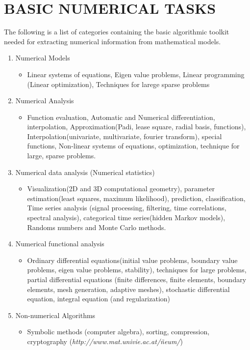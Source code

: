 \documentclass[12pt]{report}
\begin{document}
	\section{BASIC NUMERICAL TASKS}
	The following is a list of categories containing the basic algorithmic toolkit needed for extracting numerical information from mathematical models.
	\begin{enumerate}
		\item Numerical Models
		\begin{itemize}
			\item Linear systems of equations, Eigen value problems, Linear programming (Linear optimization), Techniques for larege sparse problems
		\end{itemize}
	
		\item Numerical Analysis
		\begin{itemize}
			\item Function evaluation, Automatic and Numerical differentiation, interpolation, Approximation(Padi, lease square, radial basis, functions), Interpolation(univariate, multivariate, fourier transform), special functions, Non-linear systems of equations, optimization, technique for large, sparse problems.
		\end{itemize}
		
		\item Numerical data analysis (Numerical statistics)
		\begin{itemize}
			\item Visualization(2D and 3D computational geometry), parameter estimation(least squares, maximum likelihood), prediction, classification, Time series analysis (signal processing, filtering, time correlations, spectral analysis), categorical time series(hidden Markov models), Randoms numbers and Monte Carlo methods.
		\end{itemize}
	
		\item Numerical functional analysis
		\begin{itemize}
			\item Ordinary differential equations(initial value problems, boundary value problems, eigen value problems, stability), techniques for large problems, partial differential equations (finite differences, finite elements, boundary elements, mesh generation, adaptive meshes), stochastic differential equation, integral equation (and regularization)
		\end{itemize}
	
		\item Non-numerical Algorithms
		\begin{itemize}
			\item Symbolic methods (computer algebra), sorting, compression, cryptography (\textit{http://www.mat.univie.ac.at/\~neum/})
		\end{itemize}
	\end{enumerate}
\end{document}
